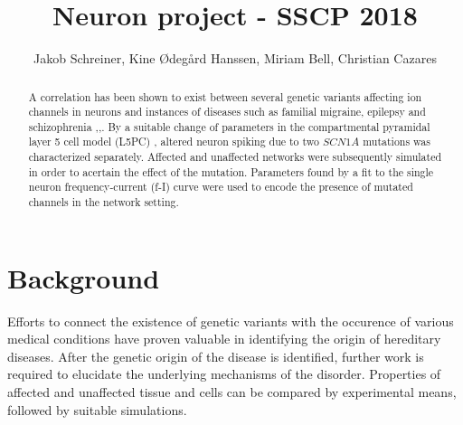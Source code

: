 \documentclass[twocolumn, a4paper,10pt, norsk]{scrartcl}
\title{Neuron project - SSCP 2018} %
\author{Jakob Schreiner, Kine Ødegård Hanssen, Miriam Bell, Christian Cazares}
\date{}
\begin{document}
\maketitle

\begin{abstract} %
 A correlation has been shown to exist between several genetic variants affecting ion channels in neurons and instances of diseases such as familial migraine, epilepsy and schizophrenia \cite{fhm},\cite{epilepsy},\cite{gautes}. By a suitable change of parameters in the compartmental pyramidal layer 5 cell model (L5PC) \cite{l5pc_model}, altered neuron spiking due to two $SCN1A$ mutations was characterized separately. Affected and unaffected networks were subsequently simulated in order to acertain the effect of the mutation. Parameters found by a fit to the single neuron frequency-current (f-I) curve were used to encode the presence of mutated channels in the network setting. %
\end{abstract}

\section*{Background}


Efforts to connect the existence of genetic variants with the occurence of various medical conditions have proven valuable in identifying the origin of hereditary diseases. After the genetic origin of the disease is identified, further work is required to elucidate the underlying mechanisms of the disorder. Properties of affected and unaffected tissue and cells can be compared by experimental means, followed by suitable simulations.

\end{document}
